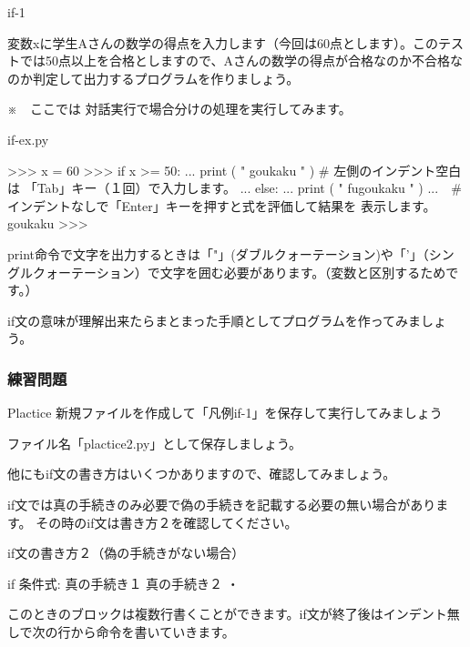 \documentclass[11pt,a4paper,dvipdfmx,titlepage]{jsreport}
\begin{document}
\begin{pabox}{if-1}

変数xに学生Aさんの数学の得点を入力します（今回は60点とします）。このテストでは50点以上を合格としますので、Aさんの数学の得点が合格なのか不合格なのか判定して出力するプログラムを作りましょう。

※　ここでは {\gt 対話実行}で場合分けの処理を実行してみます。

\begin{legbox}{if-ex.py}
\begin{listing}{1}
>>> x = 60
>>> if x >= 50:
...      print ( " goukaku " ) # 左側のインデント空白は
                                 「Tab」キー（１回）で入力します。
... else:
...      print ( " fugoukaku " )
...　#インデントなしで「Enter」キーを押すと式を評価して結果を
     表示します。
goukaku
>>>
\end{listing}
\end{legbox}


\begin{description}
 \item print命令で文字を出力するときは「"」(ダブルクォーテーション)や「'」（シングルクォーテーション）で文字を囲む必要があります。（変数と区別するためです。）
\end{description}
\end{pabox}

if文の意味が理解出来たらまとまった手順としてプログラムを作ってみましょう。

\subsubsection{練習問題}
\begin{plabox}{Plactice}
新規ファイルを作成して「凡例if-1」を保存して実行してみましょう

ファイル名「plactice2.py」として保存しましょう。
\end{plabox}

他にもif文の書き方はいくつかありますので、確認してみましょう。

if文では真の手続きのみ必要で偽の手続きを記載する必要の無い場合があります。
その時のif文は書き方２を確認してください。
\begin{grabox}{if文の書き方２（偽の手続きがない場合）}
\begin{listing}{1}
if 条件式:
    真の手続き１
    真の手続き２
    ・
\end{listing}
\end{grabox}
このときのブロックは複数行書くことができます。if文が終了後はインデント無しで次の行から命令を書いていきます。
\end{document}
